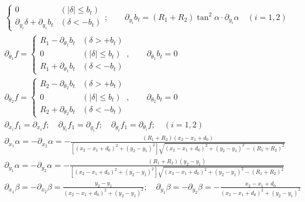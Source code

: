 \begin{gather*}
\begin{cases}
		0 & (|\delta| \le b_t) \\
		\partial_{y_i}\delta + \partial_{y_i}b_t & (\delta < -b_t)
	\end{cases} ; \qquad \partial_{y_i}b_t = (R_1 + R_2) \tan^2 \alpha \cdot \partial_{y_i}\alpha \quad (i = 1, 2)
\\[0.7em]
	\partial_{\theta_1}f = \begin{cases} 
		R_1 - \partial_{\theta_1}b_t & (\delta > +b_t) \\
		0 & (|\delta| \le b_t) \\
		R_1 + \partial_{\theta_1}b_t & (\delta < -b_t)
	\end{cases} , \qquad \partial_{\theta_1}b_t = 0 
\\[0.7em] 
	\partial_{\theta_2}f = \begin{cases} 
		R_2 - \partial_{\theta_2}b_t & (\delta > +b_t) \\
		0 & (|\delta| \le b_t) \\
		R_2 + \partial_{\theta_2}b_t & (\delta < -b_t)
	\end{cases} , \qquad \partial_{\theta_2}b_t = 0
\\[0.7em]
	\partial_{\dot{x}_i}f_1 = \partial_{x_i}f; \quad \partial_{\dot{y}_i}f_1 = \partial_{y_i}f; \quad \partial_{\dot{\theta}_i}f_1 = \partial_{\theta_i}f; \quad (i = 1, 2)
\\[0.7em]
	\partial_{x_1}\alpha = -\partial_{x_2}\alpha = -\frac{(R_1 + R_2)(x_2 - x_1 + d_0)}{\left[ (x_2 - x_1 + d_0)^2 + (y_2 - y_1)^2 \right] \sqrt{(x_2 - x_1 + d_0)^2 + (y_2 - y_1)^2 - (R_1 + R_2)^2}}
\\[0.7em]
	\partial_{y_1}\alpha = -\partial_{y_2}\alpha = -\frac{(R_1 + R_2)(y_2 - y_1)}{\left[ (x_2 - x_1 + d_0)^2 + (y_2 - y_1)^2 \right] \sqrt{(x_2 - x_1 + d_0)^2 + (y_2 - y_1)^2 - (R_1 + R_2)^2}}
\\[0.7em]
	\partial_{x_1}\beta = -\partial_{x_2}\beta = \frac{y_2 - y_1}{(x_2 - x_1 + d_0)^2 + (y_2 - y_1)^2}; \quad \partial_{y_1}\beta = -\partial_{y_2}\beta = -\frac{x_2 - x_1 + d_0}{(x_2 - x_1 + d_0)^2 + (y_2 - y_1)^2}
\end{gather*}
